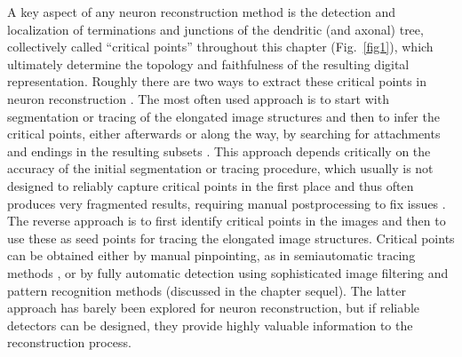 A key aspect of any neuron reconstruction method is the detection and localization of terminations and junctions of the dendritic (and axonal) tree, collectively called ``critical points'' throughout this chapter (Fig.~\ref{fig1}), which ultimately determine the topology and faithfulness of the resulting digital representation. Roughly there are two ways to extract these critical points in neuron reconstruction \cite{al2008improved, meijering2010neuron, basu2013segmentation}. The most often used approach is to start with segmentation or tracing of the elongated image structures and then to infer the critical points, either afterwards or along the way, by searching for attachments and endings in the resulting subsets \cite{dima2002automatic, xiong2006automated, narro2007neuronmetrics, vasilkoski2009detection, bas2011principal, chothani2011automated, Dehmelt-2011, ho2011neurphologyj, choromanska2012automatic, xiao2013app2}. This approach depends critically on the accuracy of the initial segmentation or tracing procedure, which usually is not designed to reliably capture critical points in the first place and thus often produces very fragmented results, requiring manual postprocessing to fix issues \cite{peng2011proof, luisi2011farsight, dercksen2014filament}. The reverse approach is to first identify critical points in the images and then to use these as seed points for tracing the elongated image structures. Critical points can be obtained either by manual pinpointing, as in semiautomatic tracing methods \cite{meijering2004design, schmitt2004new, narro2007neuronmetrics, lu2009semi, peng2010v3d, longair2011simple}, or by fully automatic detection using sophisticated image filtering and pattern recognition methods (discussed in the chapter sequel). The latter approach has barely been explored for neuron reconstruction, but if reliable detectors can be designed, they provide highly valuable information to the reconstruction process.

